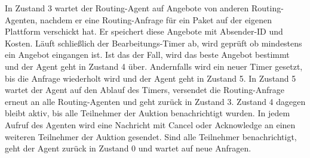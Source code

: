 In Zustand 3 wartet der Routing-Agent auf Angebote von anderen Routing-Agenten, nachdem er eine Routing-Anfrage für ein Paket auf der eigenen Plattform verschickt hat. Er speichert diese Angebote mit Absender-ID und Kosten. Läuft schließlich der Bearbeitungs-Timer ab, wird geprüft ob mindestens ein Angebot eingangen ist. Ist das der Fall, wird das beste Angebot bestimmt und der Agent geht in Zustand 4 über. Andernfalls wird ein neuer Timer gesetzt, bis die Anfrage wiederholt wird und der Agent geht in Zustand 5. In Zustand 5 wartet der Agent auf den Ablauf des Timers, versendet die Routing-Anfrage erneut an alle Routing-Agenten und geht zurück in Zustand 3. Zustand 4 dagegen bleibt aktiv, bis alle Teilnehmer der Auktion benachrichtigt wurden. In jedem Aufruf des Agenten wird eine Nachricht mit Cancel oder Acknowledge an einen weiteren Teilnehmer der Auktion gesendet. Sind alle Teilnehmer benachrichtigt, geht der Agent zurück in Zustand 0 und wartet auf neue Anfragen.
